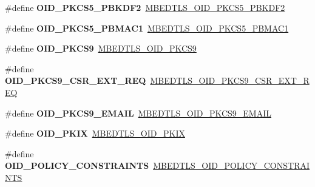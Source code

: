 \begin{DoxyCompactItemize}
\item 
\mbox{\label{compat-1_83_8h_a550e322a6f7502ffc76d5b5dee67e932}} 
\#define {\bfseries O\+I\+D\+\_\+\+P\+K\+C\+S5\+\_\+\+P\+B\+K\+D\+F2}~\mbox{\hyperlink{oid_8h_a500875913ec198a978aab4861ae59079}{M\+B\+E\+D\+T\+L\+S\+\_\+\+O\+I\+D\+\_\+\+P\+K\+C\+S5\+\_\+\+P\+B\+K\+D\+F2}}
\item 
\mbox{\label{compat-1_83_8h_afe4e0da5693667f9ea40a5df9f6d1c61}} 
\#define {\bfseries O\+I\+D\+\_\+\+P\+K\+C\+S5\+\_\+\+P\+B\+M\+A\+C1}~\mbox{\hyperlink{oid_8h_ac7e49c8e39ff6948e28e52a77da53b0d}{M\+B\+E\+D\+T\+L\+S\+\_\+\+O\+I\+D\+\_\+\+P\+K\+C\+S5\+\_\+\+P\+B\+M\+A\+C1}}
\item 
\mbox{\label{compat-1_83_8h_a83854c65d3947ccff4c7b6b1dc2195b2}} 
\#define {\bfseries O\+I\+D\+\_\+\+P\+K\+C\+S9}~\mbox{\hyperlink{oid_8h_acfde345687a3ba616fde6f1a67e5b235}{M\+B\+E\+D\+T\+L\+S\+\_\+\+O\+I\+D\+\_\+\+P\+K\+C\+S9}}
\item 
\mbox{\label{compat-1_83_8h_aa550dfc59d7003fde6fba617a3419126}} 
\#define {\bfseries O\+I\+D\+\_\+\+P\+K\+C\+S9\+\_\+\+C\+S\+R\+\_\+\+E\+X\+T\+\_\+\+R\+EQ}~\mbox{\hyperlink{oid_8h_a683642cedc9dfe3b005e123a3d828e0f}{M\+B\+E\+D\+T\+L\+S\+\_\+\+O\+I\+D\+\_\+\+P\+K\+C\+S9\+\_\+\+C\+S\+R\+\_\+\+E\+X\+T\+\_\+\+R\+EQ}}
\item 
\mbox{\label{compat-1_83_8h_af0fac7acdd45c0c38eb50aa675c73f54}} 
\#define {\bfseries O\+I\+D\+\_\+\+P\+K\+C\+S9\+\_\+\+E\+M\+A\+IL}~\mbox{\hyperlink{oid_8h_a906ce873f43785cddfd0e0b47d6301e2}{M\+B\+E\+D\+T\+L\+S\+\_\+\+O\+I\+D\+\_\+\+P\+K\+C\+S9\+\_\+\+E\+M\+A\+IL}}
\item 
\mbox{\label{compat-1_83_8h_a81d4657c41d7667bdef2d4c2f011b3cb}} 
\#define {\bfseries O\+I\+D\+\_\+\+P\+K\+IX}~\mbox{\hyperlink{oid_8h_ac711a26e8da91c73d27d7cd582d2d6d8}{M\+B\+E\+D\+T\+L\+S\+\_\+\+O\+I\+D\+\_\+\+P\+K\+IX}}
\item 
\mbox{\label{compat-1_83_8h_ae47ddb7a65cc647ba27f5269be50a2af}} 
\#define {\bfseries O\+I\+D\+\_\+\+P\+O\+L\+I\+C\+Y\+\_\+\+C\+O\+N\+S\+T\+R\+A\+I\+N\+TS}~\mbox{\hyperlink{oid_8h_a50d5ff081bcca9a268cf4e2145d65145}{M\+B\+E\+D\+T\+L\+S\+\_\+\+O\+I\+D\+\_\+\+P\+O\+L\+I\+C\+Y\+\_\+\+C\+O\+N\+S\+T\+R\+A\+I\+N\+TS}}

\end{DoxyCompactItemize}
